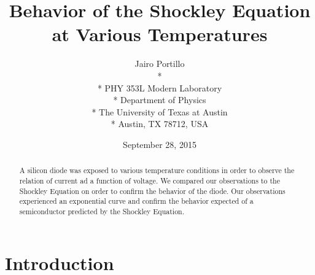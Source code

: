 \documentclass[11pt,letterpaper,onecolumn]{article}
\begin{document}

\title{\bf Behavior of the Shockley Equation at Various Temperatures}

\author{
 Jairo Portillo \\*
  \\*
 PHY 353L Modern Laboratory \\*
 Department of Physics \\*
 The University of Texas at Austin \\*
 Austin, TX 78712, USA
}
\date{September 28, 2015}


\maketitle


\begin{abstract}
A silicon diode was exposed to various temperature conditions in order to observe
the relation of current ad a function of voltage. We compared our observations to
the Shockley Equation on order to confirm the behavior of the diode. Our
observations experienced an exponential curve and confirm the behavior expected of
a semiconductor predicted by the Shockley Equation.

\end{abstract}



\section{Introduction}
\end{document}
